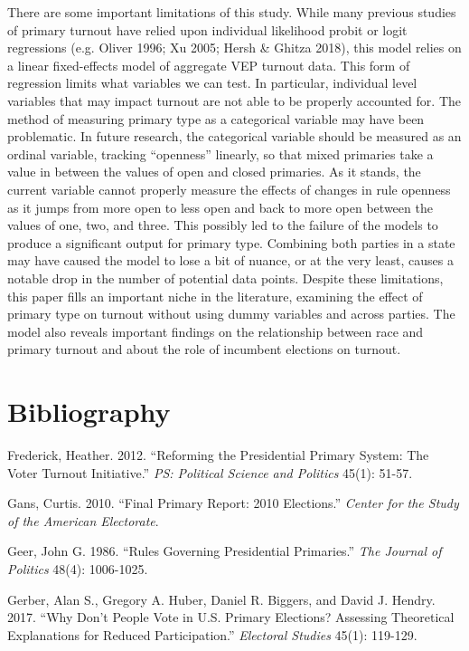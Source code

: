 \documentclass[12pt]{article}
\begin{document}
\begin{doublespace}
		There are some important limitations of this study. While many previous studies of primary turnout have relied upon individual likelihood probit or logit regressions (e.g. Oliver 1996; Xu 2005; Hersh \& Ghitza 2018), this model relies on a linear fixed-effects model of aggregate VEP turnout data. This form of regression limits what variables we can test. In particular, individual level variables that may impact turnout are not able to be properly accounted for. The method of measuring primary type as a categorical variable may have been problematic. In future research, the categorical variable should be measured as an ordinal variable, tracking ``openness” linearly, so that mixed primaries take a value in between the values of open and closed primaries. As it stands, the current variable cannot properly measure the effects of changes in rule openness as it jumps from more open to less open and back to more open between the values of one, two, and three. This possibly led to the failure of the models to produce a significant output for primary type. Combining both parties in a state may have caused the model to lose a bit of nuance, or at the very least, causes a notable drop in the number of potential data points. Despite these limitations, this paper fills an important niche in the literature, examining the effect of primary type on turnout without using dummy variables and across parties. The model also reveals important findings on the relationship between race and primary turnout and about the role of incumbent elections on turnout.    
		\section*{Bibliography}
		\begin{hangparas}{.25in}{1}
			Frederick, Heather. 2012. “Reforming the Presidential Primary System: The Voter Turnout Initiative.” \textit{PS: Political Science and Politics} 45(1): 51-57.
			
			Gans, Curtis. 2010. “Final Primary Report: 2010 Elections.” \textit{Center for the Study of the American Electorate}. 
			
			Geer, John G. 1986. “Rules Governing Presidential Primaries.” \textit{The Journal of Politics} 48(4): 1006-1025.
			
			Gerber, Alan S., Gregory A. Huber, Daniel R. Biggers, and David J. Hendry. 2017. “Why Don’t People Vote in U.S. Primary Elections? Assessing Theoretical Explanations for Reduced Participation.” \textit{Electoral Studies} 45(1): 119-129.
			

\end{hangparas}
\end{doublespace}
\end{document}
